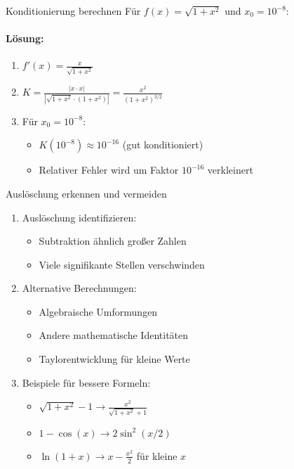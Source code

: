\begin{example2}{Konditionierung berechnen}
Für $f(x) = \sqrt{1+x^2}$ und $x_0 = 10^{-8}$:

\paragraph{Lösung:}
\begin{enumerate}
    \item $f'(x) = \frac{x}{\sqrt{1+x^2}}$
    \item $K = \frac{|x \cdot x|}{|\sqrt{1+x^2} \cdot (1+x^2)|} = \frac{x^2}{(1+x^2)^{3/2}}$
    \item Für $x_0 = 10^{-8}$:
    \begin{itemize}
        \item $K(10^{-8}) \approx 10^{-16}$ (gut konditioniert)
        \item Relativer Fehler wird um Faktor $10^{-16}$ verkleinert
    \end{itemize}
\end{enumerate}
\end{example2}

\begin{KR}{Auslöschung erkennen und vermeiden}
\begin{enumerate}
    \item Auslöschung identifizieren:
    \begin{itemize}
        \item Subtraktion ähnlich großer Zahlen
        \item Viele signifikante Stellen verschwinden
    \end{itemize}
    \item Alternative Berechnungen:
    \begin{itemize}
        \item Algebraische Umformungen
        \item Andere mathematische Identitäten
        \item Taylorentwicklung für kleine Werte
    \end{itemize}
    \item Beispiele für bessere Formeln:
    \begin{itemize}
        \item $\sqrt{1+x^2}-1 \rightarrow \frac{x^2}{\sqrt{1+x^2}+1}$
        \item $1-\cos(x) \rightarrow 2\sin^2(x/2)$
        \item $\ln(1+x) \rightarrow x-\frac{x^2}{2}$ für kleine $x$
    \end{itemize}
\end{enumerate}
\end{KR}

